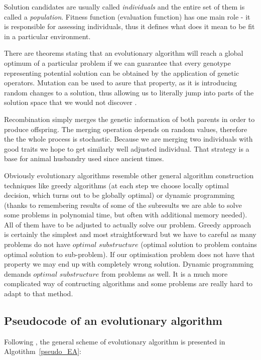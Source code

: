Solution candidates are usually called \emph{individuals} and the entire set of them is called a \emph{population}. 
Fitness function (evaluation function) has one main role - it is responsible for assessing individuals, thus it defines what does it mean to be fit in a particular
environment.

There are theorems stating that an evolutionary algorithm will reach a global optimum of a particular problem if we can guarantee that every genotype representing
potential solution can be obtained by the application of genetic operators.
Mutation can be used to asure that property, as it is introducing random changes to a solution, thus allowing us to literally jump into parts of the solution space
that we would not discover \cite{evo}.       

Recombination simply merges the genetic information of both parents in order to produce offspring.
The merging operation depends on random values, therefore the the whole process is stochastic.
Because we are merging two individuals with good traits we hope to get similarly well adjusted individual.
That strategy is a base for animal husbandry used since ancient times.
   
Obviously evolutionary algorithms resemble other general algorithm construction techniques like greedy algorithms (at each step we choose locally optimal decision, which 
turns out to be globally optimal) or dynamic programming (thanks to remembering results of some of the subresults we are able to solve some problems 
in polynomial time, but often with additional memory needed).
All of them have to be adjusted to actually solve our problem.
Greedy approach is certainly the simplest and most straightforward but we have to careful as many problems do not have $optimal$ $substructure$ (optimal solution
to problem contains optimal solution to sub-problem).
If our optimisation problem does not have that property we may end up with completely wrong solution.
Dynamic programming demands $optimal$ $substructure$ from problems as well.
It is a much more complicated way of contructing algorithms and some problems are really hard to adapt to that method.
 

\subsection{Pseudocode of an evolutionary algorithm}

Following \cite{evo}, the general scheme of evolutionary algorithm is presented in Algotithm~\ref{pseudo_EA}:
 

